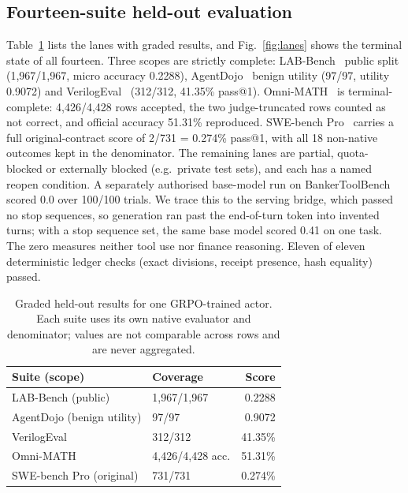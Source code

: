 \documentclass[conference]{IEEEtran}
\begin{document}
\subsection{Fourteen-suite held-out evaluation}
Table~\ref{tab:campaign} lists the lanes with graded results, and
Fig.~\ref{fig:lanes} shows the terminal state of all fourteen. Three scopes are
strictly complete: LAB-Bench~\cite{laurent2024labbench} public split
(1,967/1,967, micro accuracy 0.2288), AgentDojo~\cite{debenedetti2024agentdojo}
benign utility (97/97, utility 0.9072) and VerilogEval~\cite{liu2023verilogeval}
(312/312, 41.35\% pass@1). Omni-MATH~\cite{gao2024omnimath} is
terminal-complete: 4,426/4,428 rows accepted, the two judge-truncated rows
counted as not correct, and official accuracy 51.31\% reproduced. SWE-bench
Pro~\cite{deng2025swebenchpro} carries a full original-contract score of
2/731 = 0.274\% pass@1, with all 18 non-native outcomes kept in the
denominator. The remaining lanes are partial, quota-blocked or externally
blocked (e.g.\ private test sets), and each has a named reopen condition. A
separately authorised base-model run on BankerToolBench scored 0.0 over
100/100 trials. We trace this to the serving bridge, which passed no stop
sequences, so generation ran past the end-of-turn token into invented turns;
with a stop sequence set, the same base model scored 0.41 on one task. The
zero measures neither tool use nor finance reasoning. Eleven of eleven deterministic ledger checks
(exact divisions, receipt presence, hash equality) passed.

\begin{table}[t]
\caption{Graded held-out results for one GRPO-trained actor. Each
suite uses its own native evaluator and denominator; values are not comparable
across rows and are never aggregated.}
\label{tab:campaign}
\centering
\small
\begin{tabular}{@{}llr@{}}
\toprule
Suite (scope) & Coverage & Score \\
\midrule
LAB-Bench (public) & 1,967/1,967 & 0.2288 \\
AgentDojo (benign utility) & 97/97 & 0.9072 \\
VerilogEval & 312/312 & 41.35\% \\
Omni-MATH & 4,426/4,428 acc. & 51.31\% \\
SWE-bench Pro (original) & 731/731 & 0.274\% \\
\bottomrule
\end{tabular}
\end{table}
\end{document}
